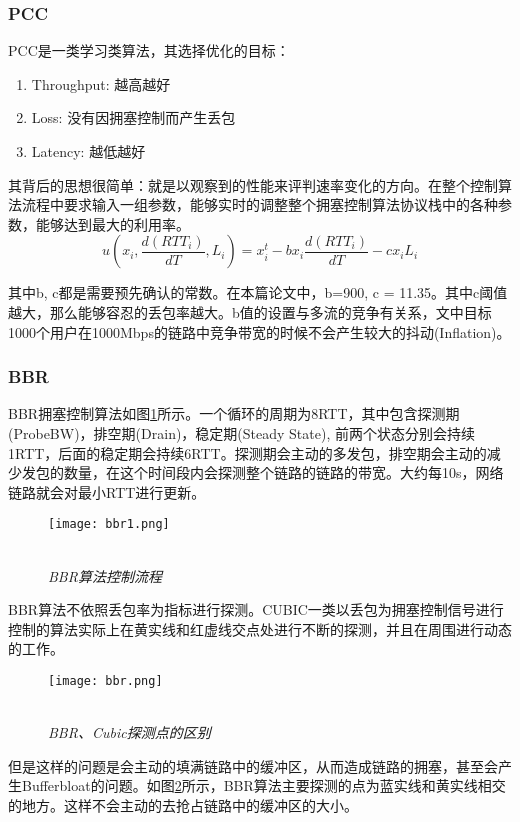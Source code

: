 \documentclass[a4paper, 12pt, UTF8]{ctexart}
\begin{document}
\subsubsection{PCC}
\par PCC\cite{DongMZAGGS18}是一类学习类算法，其选择优化的目标：
\begin{enumerate}
	\item Throughput: 越高越好
	\item Loss: 没有因拥塞控制而产生丢包
	\item Latency: 越低越好
\end{enumerate}
\par 其背后的思想很简单：就是以观察到的性能来评判速率变化的方向。在整个控制算法流程中要求输入一组参数，能够实时的调整整个拥塞控制算法协议栈中的各种参数，能够达到最大的利用率。
$$
u(x_i, \frac{d(RTT_i)}{dT}, L_i) = x_i^t-bx_i\frac{d(RTT_i)}{dT}-cx_iL_i
$$
\par 其中b, c都是需要预先确认的常数。在本篇论文中，b=900, c = 11.35。其中c阈值越大，那么能够容忍的丢包率越大。b值的设置与多流的竞争有关系，文中目标1000个用户在1000Mbps的链路中竞争带宽的时候不会产生较大的抖动(Inflation)。

\subsubsection{BBR}
\par BBR\cite{DBLP:journals/queue/CardwellCGYJ16}拥塞控制算法如图\ref{fig:BBR process}所示。一个循环的周期为8RTT，其中包含探测期(ProbeBW)，排空期(Drain)，稳定期(Steady State), 前两个状态分别会持续1RTT，后面的稳定期会持续6RTT。探测期会主动的多发包，排空期会主动的减少发包的数量，在这个时间段内会探测整个链路的链路的带宽。大约每10s，网络链路就会对最小RTT进行更新。

\begin{figure}[H]
	\centering \texttt{[image: bbr1.png]}
	\\ \hspace*{\fill} \\
	\caption{\em BBR算法控制流程}
	\label{fig:BBR process}
\end{figure}

\par BBR算法不依照丢包率为指标进行探测。CUBIC一类以丢包为拥塞控制信号进行控制的算法实际上在黄实线和红虚线交点处进行不断的探测，并且在周围进行动态的工作。

\begin{figure}[H]
	\centering \texttt{[image: bbr.png]}
	\\ \hspace*{\fill} \\
	\caption{\em BBR、Cubic探测点的区别}
	\label{fig:BBR algorithm}
\end{figure}
\par 但是这样的问题是会主动的填满链路中的缓冲区，从而造成链路的拥塞，甚至会产生Bufferbloat的问题。如图\ref{fig:BBR algorithm}所示，BBR算法主要探测的点为蓝实线和黄实线相交的地方。这样不会主动的去抢占链路中的缓冲区的大小。
\end{document}
